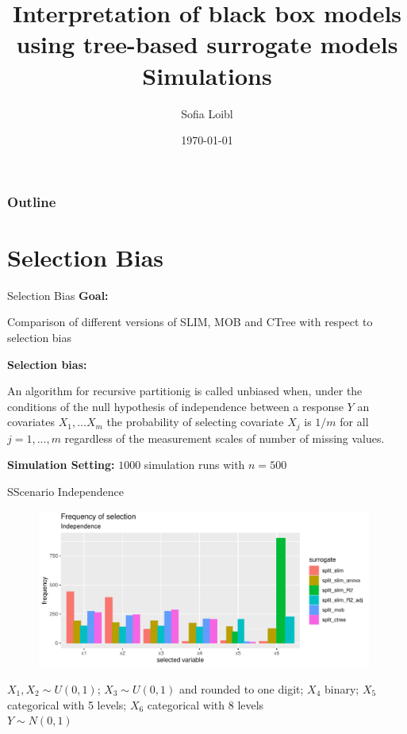 \documentclass[9pt, xcolor=table]{beamer}
\title[Interpretation of black box models]{Interpretation of black box models using tree-based surrogate models \newline \small{Simulations}}
\author[Sofia Loibl]{Sofia Loibl}
\institute[LMU]{LMU München}
\date{\today}
\begin{document}
\begin{frame}
\titlepage 
\end{frame}


\begin{frame}
\frametitle{Outline} 
\tableofcontents 
\end{frame}

\section{Selection Bias}
\begin{frame}{Selection Bias}
\textbf{Goal:} 

Comparison of different versions of SLIM, MOB and CTree with respect to selection bias
\vspace{0.5cm}


\textbf{Selection bias:} 

An algorithm for recursive partitionig is called unbiased when, under the conditions of the null hypothesis of independence between a response $Y$ an covariates $X_{1},...X_{m}$ the probability of selecting covariate $X_{j}$ is $1/m$ for all $j = 1,...,m$ regardless of the measurement scales of number of missing values. \citep{Hothorn.2006}
\vspace{0.5cm}

\textbf{Simulation Setting:} $1000$ simulation runs with $n= 500$
\end{frame}


\begin{frame}{SScenario Independence}
\begin{figure}
    \includegraphics[width=11cm]{Figures/Selection_Bias/independence_frequency.pdf}
\end{figure}

$X_{1}, X_{2} \sim U(0,1)$; 
$X_{3} \sim U(0,1)$ and rounded to one digit;
$X_{4}$ binary;
$X_{5}$ categorical with 5 levels;
$X_{6}$ categorical with 8 levels\\
$Y \sim N(0,1)$

\end{frame}
\end{document}
